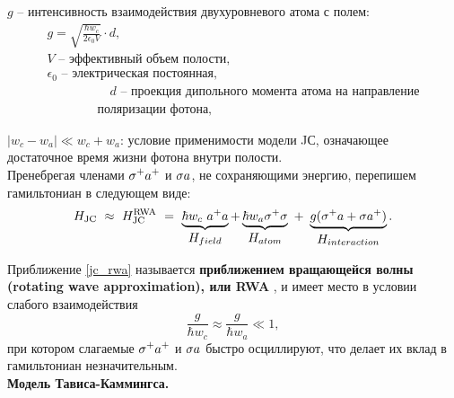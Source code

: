 \hspace{25pt}$g$ -- интенсивность взаимодействия двухуровневого атома с полем:
\begin{gather*}
	g = \sqrt{\frac{\hbar w_{c}}{2 \epsilon_{0} V}} \cdot d,\\
	V\text{ -- эффективный объем полости},\\
	\epsilon_{0}\text{ -- электрическая постоянная},\\
	\hspace{5em}d\text{ -- проекция дипольного момента атома на направление}\\
	\hspace{4em}\text{поляризации фотона},
\end{gather*}

\vspace{-0.5em}
\hspace{25pt}$|w_{c}-w_{a}|\ll w_{c}+w_{a}$: условие применимости модели JС, означающее\\
\indent\hspace{11em}достаточное время жизни фотона внутри полости.
\\[18pt]
\noindent Пренебрегая членами $\displaystyle{\sigma^{+}a^{+}}$ и $\displaystyle{\sigma a}$, не сохраняющими энергию, перепишем гамильтониан в следующем виде:
\begin{equation}\label{jc_rwa}
	H_{\text{JC}}~\approx~H_{\text{JC}}^{\text{RWA}}~=~\underbrace{\hbar w_{c}\ a^{+}a}_{\textstyle H_{field}} + \underbrace{\hbar w_{a}\sigma^{+}\sigma}_{\textstyle H_{atom}}~+~\underbrace{g(\sigma^{+}a+\sigma a^{+})}_{\textstyle H_{interaction}}.
\end{equation}

\noindent Приближение \eqref{jc_rwa} называется \textbf{приближением вращающейся волны (rotating wave approximation), или RWA} \cite{ozhigov_qq,rwa_1,rwa_2}, и имеет место в условии слабого взаимодействия
\begin{equation}
	\frac{g}{\hbar w_{c}}\approx\frac{g}{\hbar w_{a}}\ll1,
\end{equation}
при котором слагаемые $\displaystyle{\sigma^{+}a^{+}}$ и $\displaystyle{\sigma a}$ быстро осциллируют, что делает их вклад в гамильтониан незначительным.
\\[28pt]
\indent\textbf{Модель Тависа-Каммингса.}

